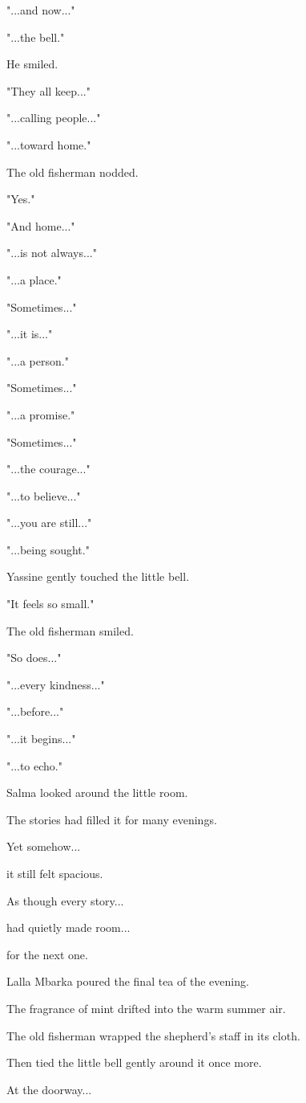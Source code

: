 \documentclass[12pt,openany]{book}
\begin{document}
"...and now..."

"...the bell."

He smiled.

"They all keep..."

"...calling people..."

"...toward home."

The old fisherman nodded.

"Yes."

"And home..."

"...is not always..."

"...a place."

"Sometimes..."

"...it is..."

"...a person."

"Sometimes..."

"...a promise."

"Sometimes..."

"...the courage..."

"...to believe..."

"...you are still..."

"...being sought."

Yassine gently touched the little bell.

"It feels so small."

The old fisherman smiled.

"So does..."

"...every kindness..."

"...before..."

"...it begins..."

"...to echo."

Salma looked around the little room.

The stories had filled it for many evenings.

Yet somehow...

it still felt spacious.

As though every story...

had quietly made room...

for the next one.

Lalla Mbarka poured the final tea of the evening.

The fragrance of mint drifted into the warm summer air.

The old fisherman wrapped the shepherd's staff in its cloth.

Then tied the little bell gently around it once more.

At the doorway...
\end{document}
